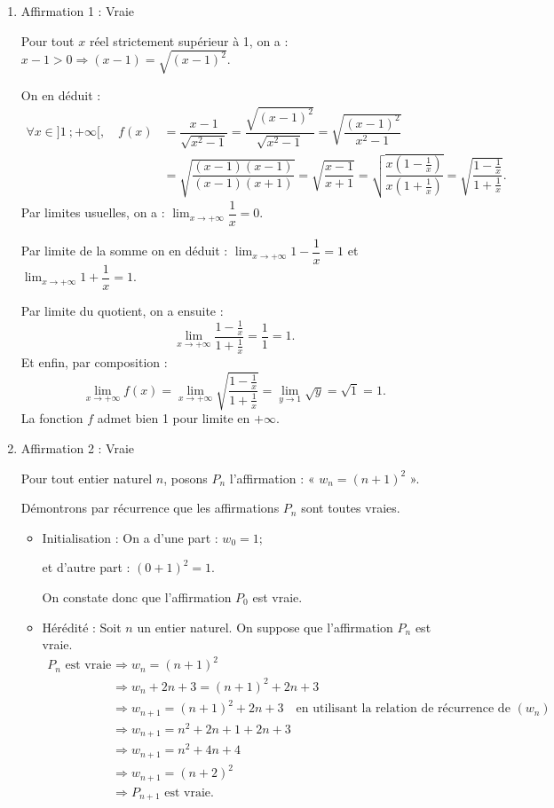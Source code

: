 \begin{enumerate}
\item Affirmation 1 : Vraie

Pour tout $x$ réel strictement supérieur à 1, on a : $x-1>0\Longrightarrow (x-1)=\sqrt{(x-1)^2}$.

On en déduit :
\[
\begin{aligned}
\forall x\in ]1~;+\infty[,\quad f(x)&=\dfrac{x-1}{\sqrt{x^2-1}}=\dfrac{\sqrt{(x-1)^2}}{\sqrt{x^2-1}}=\sqrt{\dfrac{(x-1)^2}{x^2-1}}\\
&=\sqrt{\dfrac{(x-1)(x-1)}{(x-1)(x+1)}}=\sqrt{\dfrac{x-1}{x+1}}=\sqrt{\dfrac{x\left(1-\frac1x\right)}{x\left(1+\frac1x\right)}}=\sqrt{\dfrac{1-\frac1x}{1+\frac1x}}.
\end{aligned}
\]
Par limites usuelles, on a : $\displaystyle\lim_{x\to +\infty}\dfrac1x=0$.

Par limite de la somme on en déduit : $\displaystyle\lim_{x\to +\infty}1-\dfrac1x=1$ et $\displaystyle\lim_{x\to +\infty}1+\dfrac1x=1$.

Par limite du quotient, on a ensuite :
\[
\lim_{x\to +\infty}\dfrac{1-\frac1x}{1+\frac1x}=\dfrac11=1.
\]
Et enfin, par composition :
\[
\lim_{x\to +\infty}f(x)=\lim_{x\to +\infty}\sqrt{\dfrac{1-\frac1x}{1+\frac1x}}=\lim_{y\to 1}\sqrt{y}=\sqrt1=1.
\]
La fonction $f$ admet bien 1 pour limite en $+\infty$.

\item Affirmation 2 : Vraie

Pour tout entier naturel $n$, posons $P_n$ l'affirmation : « $w_n=(n+1)^2$ ».

Démontrons par récurrence que les affirmations $P_n$ sont toutes vraies.

\begin{itemize}
\item Initialisation : On a d'une part : $w_0=1$;

et d'autre part : $(0+1)^2=1$.

On constate donc que l'affirmation $P_0$ est vraie.

\item Hérédité : Soit $n$ un entier naturel. On suppose que l'affirmation $P_n$ est vraie.
\[
\begin{aligned}
P_n \text{ est vraie }&\Longrightarrow w_n=(n+1)^2\\
&\Longrightarrow w_n+2n+3=(n+1)^2+2n+3\\
&\Longrightarrow w_{n+1}=(n+1)^2+2n+3 \quad \text{en utilisant la relation de récurrence de }(w_n)\\
&\Longrightarrow w_{n+1}=n^2+2n+1+2n+3\\
&\Longrightarrow w_{n+1}=n^2+4n+4\\
&\Longrightarrow w_{n+1}=(n+2)^2\\
&\Longrightarrow P_{n+1}\text{ est vraie.}
\end{aligned}
\]


\end{itemize}
\end{enumerate}
